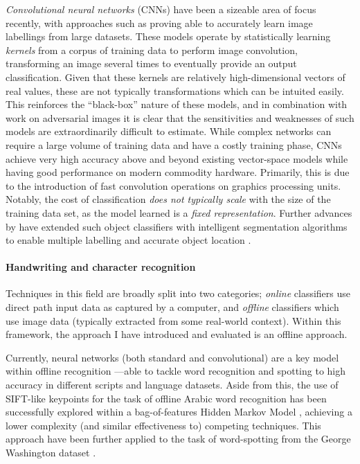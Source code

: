 \documentclass{mpaper}
\begin{document}
\emph{Convolutional neural networks} (CNNs) have been a sizeable area of focus recently, with approaches such as \citeauthor{ConvNet} \cite{ConvNet} proving able to accurately learn image labellings from large datasets.
These models operate by statistically learning \emph{kernels} from a corpus of training data to perform image convolution, transforming an image several times to eventually provide an output classification.
Given that these kernels are relatively high-dimensional vectors of real values, these are not typically transformations which can be intuited easily.
This reinforces the ``black-box'' nature of these models, and in combination with work on adversarial images \cite{AdversarialML} it is clear that the sensitivities and weaknesses of such models are extraordinarily difficult to estimate.
While complex networks can require a large volume of training data and have a costly training phase, CNNs achieve very high accuracy above and beyond existing vector-space models while having good performance on modern commodity hardware.
Primarily, this is due to the introduction of fast convolution operations on graphics processing units.
Notably, the cost of classification \emph{does not typically scale} with the size of the training data set, as the model learned is a \emph{fixed representation}.
Further advances by \citeauthor{MultilabelCNN} have extended such object classifiers with intelligent segmentation algorithms \cite{BING} to enable multiple labelling and accurate object location \cite{MultilabelCNN}.


\paragraph{Handwriting and character recognition}
Techniques in this field are broadly split into two categories; \emph{online} classifiers use direct path input data as captured by a computer, and \emph{offline} classifiers which use image data (typically extracted from some real-world context).
Within this framework, the approach I have introduced and evaluated is an offline approach.

Currently, neural networks (both standard and convolutional) are a key model within offline recognition \cite{Handwriting-CNN-1,Handwriting-CNN-2}---able to tackle word recognition and spotting to high accuracy in different scripts and language datasets.
Aside from this, the use of SIFT-like keypoints for the task of offline Arabic word recognition has been successfully explored within a bag-of-features Hidden Markov Model \cite{Arabic-SIFT}, achieving a lower complexity (and similar effectiveness to) competing techniques.
This approach have been further applied to the task of word-spotting from the George Washington dataset \cite{Arabic-SIFT-Better}.
\end{document}
